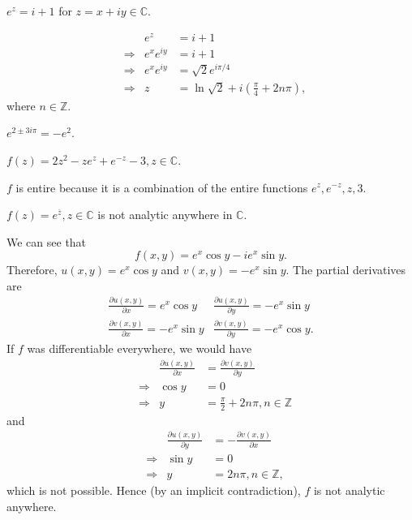 \documentclass[12pt]{book}
\begin{document}
\begin{exmp}
    $e^{z} = i + 1$ for $z = x + iy \in \mathbb{C}$.
\end{exmp}
\begin{align*}
    &&e^{z}
        &=
            i + 1 \\
    &\Rightarrow &e^{x}e^{iy}
        &=
            i + 1 \\
    &\Rightarrow &e^{x}e^{iy}
        &=
            \sqrt{2}e^{i\pi/4} \\
    &\Rightarrow &z
        &=
            \ln \sqrt{2} + i \left(\frac{\pi}{4} + 2n\pi\right),
\end{align*}
where $n \in \mathbb{Z}.$

\begin{exmp}
    $e^{2 \pm 3i\pi} = -e^{2}.$
\end{exmp}

\begin{exmp}
    $f(z) = 2z^2 - ze^{z} + e^{-z} - 3, z \in \mathbb{C}.$
\end{exmp}
$f$ is entire because it is a combination of the entire functions $e^{z}, e^{-z}, z, 3$.

\begin{exmp} 
    $f(z) = e^{\overline{z}}, z \in \mathbb{C}$ is not analytic anywhere in $\mathbb{C}.$
\end{exmp}
We can see that 
\[
    f(x, y) = e^{x}\cos y - ie^{x}\sin y.
\]
Therefore, $u(x, y) = e^{x}\cos y$ and $v(x, y) = -e^{x}\sin y$. The partial derivatives are
\[
    \begin{array}{cc}
        \frac{\partial u(x, y)}{\partial x} = e^{x}\cos y & \frac{\partial u(x, y)}{\partial y} = -e^{x}\sin y \\
        \frac{\partial v(x, y)}{\partial x} = -e^{x}\sin y & \frac{\partial v(x, y)}{\partial y} = -e^{x}\cos y.
    \end{array}
\]
If $f$ was differentiable everywhere, we would have 
\begin{align*}
    &&\frac{\partial u(x, y)}{\partial x}
        &= 
            \frac{\partial v(x, y)}{\partial y} \\
    &\Rightarrow &\cos y 
        &=
            0 \\
    &\Rightarrow &y 
        &= 
            \frac{\pi}{2} + 2n\pi, n \in \mathbb{Z}
\end{align*}
and 
\begin{align*}
    &&\frac{\partial u(x, y)}{\partial y}
        &= 
            -\frac{\partial v(x, y)}{\partial x} \\
    &\Rightarrow &\sin y 
        &=
            0 \\
    &\Rightarrow &y 
        &= 
            2n\pi, n \in \mathbb{Z},
\end{align*}
which is not possible. Hence (by an implicit contradiction), $f$ is not analytic anywhere.
\end{document}

